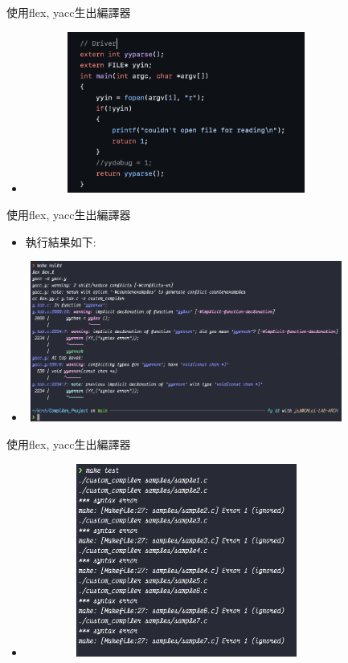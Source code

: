 \documentclass{beamer}
\begin{document}
\begin{frame}{使用flex, yacc生出編譯器}
\begin{itemize}
    \item 
    \includegraphics[width=300pt,height=150pt]{截圖 2023-05-16 下午2.36.23}
\end{itemize}
\end{frame}

\begin{frame}{使用flex, yacc生出編譯器}
\begin{itemize}
    \item 執行結果如下:
    \item 
    \includegraphics[width=300pt,height=150pt]{238418057-ddf2bca5-cdba-48f9-9b31-7cc684d9087e}
\end{itemize}
\end{frame}
\begin{frame}{使用flex, yacc生出編譯器}
\begin{itemize}
    \item 
    \includegraphics[width=300pt,height=180pt]{238418183-99987aa3-0810-4e34-a41e-92acb99df7cb.png}
\end{itemize}
\end{frame}
\end{document}
